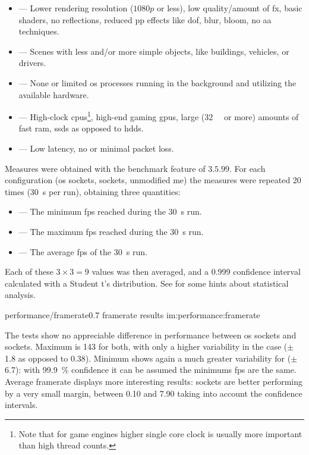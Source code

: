 \begin{itemize}
	\item {} --- Lower rendering resolution ($1080p$ or less), low quality/amount of \gls{fx}, basic shaders, no reflections, reduced \gls{pp} effects like \gls{dof}, blur, bloom, no \gls{aa} techniques.
	\item {} --- Scenes with less and/or more simple objects, like buildings, vehicles, or drivers.
	\item {} --- None or limited \gls{os} processes running in the background and utilizing the available hardware.
	\item {} --- High-clock \glspl{cpu}\footnote{Note that for game engines higher single core clock is usually more important than high thread counts.}, high-end gaming \glspl{gpu}, large (\SI{32}{\giga\byte} or more) amounts of fast \gls{ram}, \glspl{ssd} as opposed to \glspl{hdd}.
	\item {} --- Low latency, no or minimal packet loss.
\end{itemize}

Measures were obtained with the benchmark feature of  $3.5.99$. For each configuration (\gls{os} sockets,  sockets, unmodified \gls{me}) the measures were repeated \num{20} times (\SI{30}{\second} per run), obtaining three quantities:

\begin{itemize}
	\item {} --- The minimum \gls{fps} reached during the \SI{30}{\second} run.
	\item {} --- The maximum \gls{fps} reached during the \SI{30}{\second} run.
	\item {} --- The average \gls{fps} of the \SI{30}{\second} run.
\end{itemize}

\FLOATnoindent Each of these $3\times3=9$ values was then averaged, and a \num{0,999} confidence interval calculated with a Student t's distribution. See  for some hints about statistical analysis.

\begin{image}
	{performance/framerate}{0.7}
	{framerate results}
	{im:performance:framerate}
	{}
	{}
\end{image} %

The tests show no appreciable difference in performance between \gls{os} sockets and  sockets. Maximum is \SI{143}{\fps} for both, with only a higher variability in the  case ($\pm$\SI{1,8}{\fps} as opposed to \SI{0,38}{\fps}). Minimum shows again a much greater variability for  ($\pm$\SI{6,7}{\fps}): with \SI{99,9}{\percent} confidence it can be assumed the minimums \gls{fps} are the same. Average \gls{framerate} displays more interesting results:  sockets are better performing by a very small margin, between \SI{0,10}{\fps} and \SI{7,90}{\fps} taking into account the confidence intervals.

